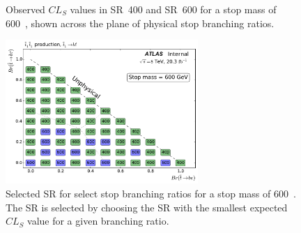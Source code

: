 \begin{figure}[ht]
  \centering
  \caption{
    Observed $CL_S$ values in SR~400 and SR~600 for a stop mass of 600~\GeV,
    shown across the plane of physical stop branching ratios.
  }
\end{figure}

\begin{figure}[ht]
  \centering
  \includegraphics[width=0.65\textwidth]
    {figs/blstop/region_selection/region_choice_vs_br_m_600.pdf}
  \caption{
    Selected SR for select stop branching ratios for a stop mass of 600~\GeV.
    The SR is selected by choosing the SR with the smallest expected $CL_S$
    value for a given branching ratio.
  }
\end{figure}

